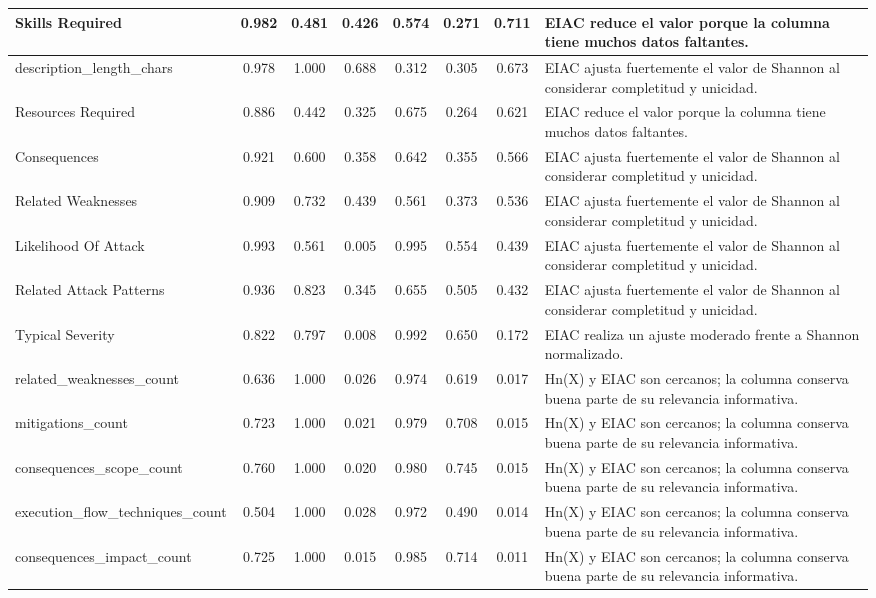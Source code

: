 \begin{table}[h]
\begin{tabular}{|p{3cm}|c|c|c|c|c|c|p{5cm}|}
\hline
Skills Required & 0.982 & 0.481 & 0.426 & 0.574 & 0.271 & 0.711 & EIAC reduce el valor porque la columna tiene muchos datos faltantes. \\
\hline
description\_length\_chars & 0.978 & 1.000 & 0.688 & 0.312 & 0.305 & 0.673 & EIAC ajusta fuertemente el valor de Shannon al considerar completitud y unicidad. \\
\hline
Resources Required & 0.886 & 0.442 & 0.325 & 0.675 & 0.264 & 0.621 & EIAC reduce el valor porque la columna tiene muchos datos faltantes. \\
\hline
Consequences & 0.921 & 0.600 & 0.358 & 0.642 & 0.355 & 0.566 & EIAC ajusta fuertemente el valor de Shannon al considerar completitud y unicidad. \\
\hline
Related Weaknesses & 0.909 & 0.732 & 0.439 & 0.561 & 0.373 & 0.536 & EIAC ajusta fuertemente el valor de Shannon al considerar completitud y unicidad. \\
\hline
Likelihood Of Attack & 0.993 & 0.561 & 0.005 & 0.995 & 0.554 & 0.439 & EIAC ajusta fuertemente el valor de Shannon al considerar completitud y unicidad. \\
\hline
Related Attack Patterns & 0.936 & 0.823 & 0.345 & 0.655 & 0.505 & 0.432 & EIAC ajusta fuertemente el valor de Shannon al considerar completitud y unicidad. \\
\hline
Typical Severity & 0.822 & 0.797 & 0.008 & 0.992 & 0.650 & 0.172 & EIAC realiza un ajuste moderado frente a Shannon normalizado. \\
\hline
related\_weaknesses\_count & 0.636 & 1.000 & 0.026 & 0.974 & 0.619 & 0.017 & Hn(X) y EIAC son cercanos; la columna conserva buena parte de su relevancia informativa. \\
\hline
mitigations\_count & 0.723 & 1.000 & 0.021 & 0.979 & 0.708 & 0.015 & Hn(X) y EIAC son cercanos; la columna conserva buena parte de su relevancia informativa. \\
\hline
consequences\_scope\_count & 0.760 & 1.000 & 0.020 & 0.980 & 0.745 & 0.015 & Hn(X) y EIAC son cercanos; la columna conserva buena parte de su relevancia informativa. \\
\hline
execution\_flow\_techniques\_count & 0.504 & 1.000 & 0.028 & 0.972 & 0.490 & 0.014 & Hn(X) y EIAC son cercanos; la columna conserva buena parte de su relevancia informativa. \\
\hline
consequences\_impact\_count & 0.725 & 1.000 & 0.015 & 0.985 & 0.714 & 0.011 & Hn(X) y EIAC son cercanos; la columna conserva buena parte de su relevancia informativa. \\

\end{tabular}
\end{table}
